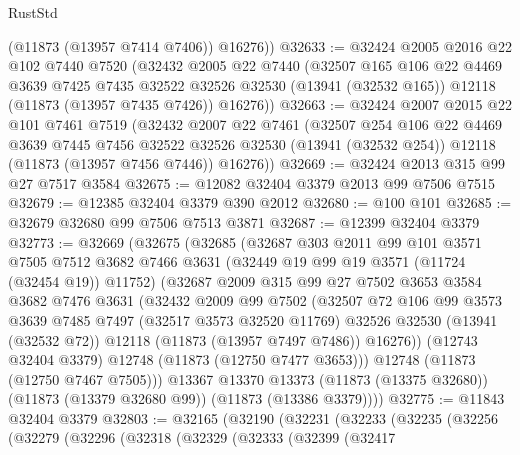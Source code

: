 \begin{lexlean}{RustStd}
\begin{coremodule}
        (@11873 (@13957 @7414 @7406))
        @16276))
@32633 := @32424
    @2005
    @2016
    @22
    @102
    @7440
    @7520
    (@32432
      @2005
      @22
      @7440
      (@32507
        @165
        @106
        @22
        @4469
        @3639
        @7425
        @7435
        @32522
        @32526
        @32530
        (@13941 (@32532 @165))
        @12118
        (@11873 (@13957 @7435 @7426))
        @16276))
@32663 := @32424
    @2007
    @2015
    @22
    @101
    @7461
    @7519
    (@32432
      @2007
      @22
      @7461
      (@32507
        @254
        @106
        @22
        @4469
        @3639
        @7445
        @7456
        @32522
        @32526
        @32530
        (@13941 (@32532 @254))
        @12118
        (@11873 (@13957 @7456 @7446))
        @16276))
@32669 := @32424 @2013 @315 @99 @27 @7517 @3584
@32675 := @12082 @32404 @3379 @2013 @99 @7506 @7515
@32679 := @12385 @32404 @3379 @390 @2012
@32680 := @100 @101
@32685 := @32679 @32680 @99 @7506 @7513 @3871
@32687 := @12399 @32404 @3379
@32773 := @32669
    (@32675
      (@32685
        (@32687
          @303
          @2011
          @99
          @101
          @3571
          @7505
          @7512
          @3682
          @7466
          @3631
          (@32449 @19 @99 @19 @3571 (@11724 (@32454 @19)) @11752)
          (@32687
            @2009
            @315
            @99
            @27
            @7502
            @3653
            @3584
            @3682
            @7476
            @3631
            (@32432
              @2009
              @99
              @7502
              (@32507
                @72
                @106
                @99
                @3573
                @3639
                @7485
                @7497
                (@32517 @3573 @32520 @11769)
                @32526
                @32530
                (@13941 (@32532 @72))
                @12118
                (@11873 (@13957 @7497 @7486))
                @16276))
            (@12743 @32404 @3379)
            @12748
            (@11873 (@12750 @7477 @3653)))
          @12748
          (@11873 (@12750 @7467 @7505)))
        @13367
        @13370
        @13373
        (@11873 (@13375 @32680))
        (@11873 (@13379 @32680 @99))
        (@11873 (@13386 @3379))))
@32775 := @11843 @32404 @3379
@32803 := @32165
    (@32190
      (@32231
        (@32233
          (@32235
            (@32256
              (@32279
                (@32296
                  (@32318
                    (@32329
                      (@32333
                        (@32399
                          (@32417

\end{coremodule}
\end{lexlean}
